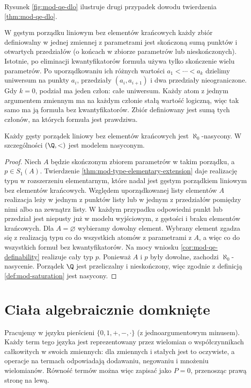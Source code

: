 Rysunek \ref{fig:mod-qe-dlo} ilustruje drugi przypadek
dowodu twierdzenia \ref{thm:mod-qe-dlo}.

\begin{przyklad}
\label{ex:mod-qe-dlo-definable}
W gęstym porządku liniowym bez elementów krańcowych
każdy zbiór definiowalny w jednej zmiennej z parametrami
jest skończoną sumą punktów i otwartych przedziałów
(o końcach w zbiorze parametrów lub nieskończonych).
Istotnie, po eliminacji kwantyfikatorów formuła używa
tylko skończenie wielu parametrów. Po uporządkowaniu
ich różnych wartości $a_1<\cdots<a_k$ dzielimy
uniwersum na punkty $a_i$, przedziały $(a_i,a_{i+1})$
i dwa przedziały nieograniczone. Gdy $k=0$, podział
ma jeden człon: całe uniwersum.
Każdy atom z jednym argumentem zmiennym ma na każdym
członie stałą wartość logiczną, więc tak samo ma ją
formuła bez kwantyfikatorów. Zbiór definiowany jest
sumą tych członów, na których formuła jest prawdziwa.
\end{przyklad}

\begin{wniosek}
\label{cor:mod-qe-dlo-saturation}
Każdy gęsty porządek liniowy bez elementów krańcowych
jest $\aleph_0$-nasycony. W szczególności $(\Q,<)$
jest modelem nasyconym.
\end{wniosek}
\begin{proof}
Niech $A$ będzie skończonym zbiorem parametrów
w takim porządku, a $p\in S_1(A)$. Twierdzenie
\ref{thm:mod-type-elementary-extension} daje realizację
typu w rozszerzeniu elementarnym, które nadal jest
gęstym porządkiem liniowym bez elementów krańcowych.
Względem uporządkowanej listy elementów $A$
realizacja leży w jednym z punktów listy lub
w jednym z przedziałów pomiędzy nimi albo
na zewnątrz listy. W każdym przypadku odpowiedni
punkt lub przedział jest niepusty już w modelu
wyjściowym, z gęstości i braku elementów krańcowych.
Dla $A=\varnothing$ wybieramy dowolny element.
Wybrany element zgadza się z realizacją typu
co do wszystkich atomów z parametrami z $A$,
a więc co do wszystkich formuł bez kwantyfikatorów.
Na mocy wniosku \ref{cor:mod-qe-definability}
realizuje cały typ $p$.
Ponieważ $A$ i $p$ były dowolne, zachodzi
$\aleph_0$-nasycenie. Porządek $\Q$ jest przeliczalny
i nieskończony, więc zgodnie z definicją
\ref{def:mod-saturation} jest nasycony.
\end{proof}

\section{Ciała algebraicznie domknięte}
Pracujemy w języku pierścieni $\{0,1,+,-,\cdot\}$
(z jednoargumentowym minusem). Każdy term tego języka
jest reprezentowany przez wielomian o współczynnikach
całkowitych w swoich zmiennych: dla zmiennych i stałych
jest to oczywiste, a operacje na termach odpowiadają
dodawaniu, negowaniu i mnożeniu wielomianów.
Równość termów można więc zapisać jako $P=0$,
przenosząc prawą stronę na lewą.

